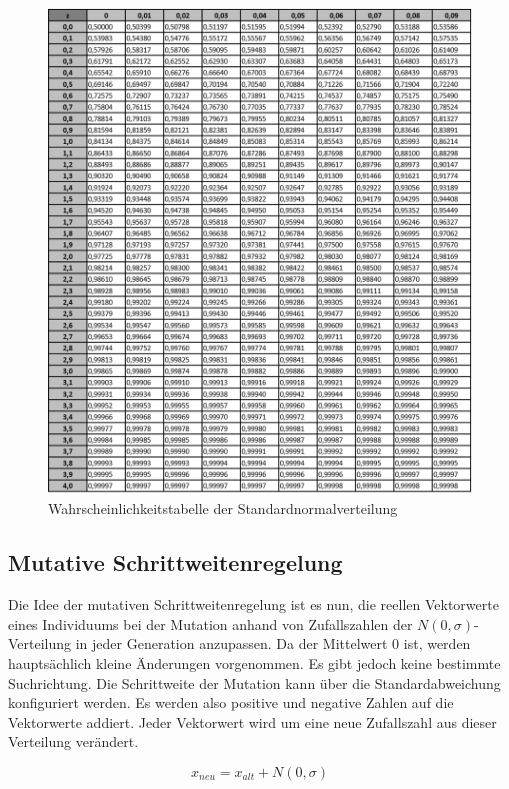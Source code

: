 \begin{figure}[H]
\centering
\includegraphics[width=\textwidth]{img/Standardnormalverteilung_Tabelle.png}
\caption{Wahrscheinlichkeitstabelle der Standardnormalverteilung}
\label{fig:standardnormalverteilung}
\end{figure}

\subsection{Mutative Schrittweitenregelung}

Die Idee der mutativen Schrittweitenregelung ist es nun, die reellen Vektorwerte eines Individuums bei der Mutation anhand von Zufallszahlen der $N(0, \sigma)$-Verteilung in jeder Generation anzupassen. Da der Mittelwert $0$ ist, werden hauptsächlich kleine Änderungen vorgenommen. Es gibt jedoch keine bestimmte Suchrichtung. Die Schrittweite der Mutation kann über die Standardabweichung konfiguriert werden. Es werden also positive und negative Zahlen auf die Vektorwerte addiert. Jeder Vektorwert wird um eine neue Zufallszahl aus dieser Verteilung verändert.

\begin{equation}
x_{neu} = x_{alt} + N(0, \sigma)
\end{equation}

